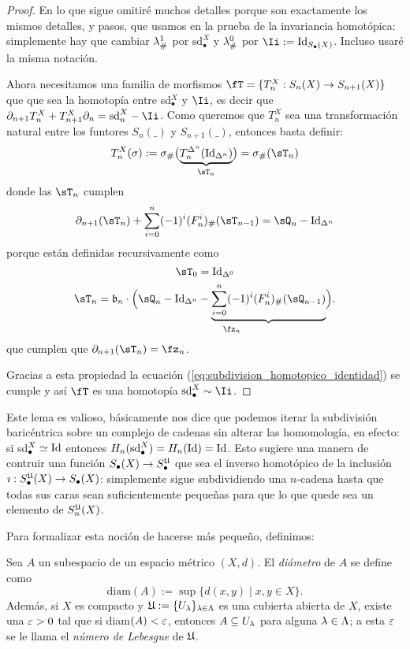 \documentclass[../../topologia_algebraica]{subfiles}
\begin{document}
\begin{proof}
  En lo que sigue omitir\'e muchos detalles porque son exactamente los mismos
  detalles, y pasos, que usamos en la prueba de la invariancia homot\'opica:
  simplemente hay que cambiar $\lambda^1_{\#}$ por $\text{sd}^X_{\bullet}$ y $\lambda^0_{\#}$
  por $\Ii:=\Id_{S_{\bullet}(X)}$. Incluso usar\'e la misma notaci\'on.
  
  Ahora necesitamos una familia de morfismos $\fT=\{T^X_n:S_n(X)\ra S_{n+1}(X)\}$ que
  que sea la homotop\'ia entre sd$^X_{\bullet}$ y $\Ii$, es decir
  que $\partial_{n+1}T^X_n+T^X_{n+1}\partial_n=\text{sd}^X_n-\Ii$. Como queremos que
  $T^X_n$ sea una transformaci\'on natural entre los funtores $S_n(\_)$ y $S_{n+1}(\_)$,
  entonces basta definir:
  \[
    T^X_n(\sigma):=
    \sigma_{\#}\big(\underset{\sT_n}{\underbrace{T^{\Delta^n}_n(\Id_{\Delta^n})}} \big)=
    \sigma_{\#}(\sT_n)
  \]
  donde las $\sT_n$ cumplen
  \begin{equation}\label{eq:subdivision_homotopico_identidad}
    \partial_{n+1}(\sT_n)+\sum_{i=0}^n(-1)^i(F^i_n)_{\#}(\sT_{n-1})=\sQ_n-\Id_{\Delta^n}
  \end{equation}
  porque est\'an definidas recursivamente como
  \[
    \sT_0=\Id_{\Delta^0}
  \]
  \[
    \sT_n=\fb_n\cdot\Big(\underset{\fz_n}{\sQ_n-\Id_{\Delta^n}-
      \underbrace{\sum_{i=0}^n(-1)^i(F^i_n)_{\#}(\sQ_{n-1})}} \Big).
  \]
  que cumplen que $\partial_{n+1}(\sT_n)=\fz_n$.

  Gracias a esta propiedad la ecuaci\'on (\ref{eq:subdivision_homotopico_identidad})
  se cumple y as\'i $\fT$ es una homotop\'ia $\text{sd}^X_{\bullet}\sim\Ii$.
\end{proof}

Este lema es valioso, b\'asicamente nos dice que podemos iterar la subdivisi\'on
baric\'entrica sobre un complejo de cadenas sin alterar las homomolog\'ia, en efecto:
si sd$^X_{\bullet}\simeq\text{Id}$ entonces $H_n(\text{sd}^X_{\bullet})=H_n(\text{Id})=\text{Id}$. Esto
sugiere una manera de contruir una funci\'on $S_{\bullet}(X)\rightarrow S_{\bullet}^{\mathfrak{U}}$
que sea el inverso homot\'opico de la inclusi\'on $\imath: S_{\bullet}^{\mathfrak{U}}(X)\rightarrow S_{\bullet}(X)$:
simplemente sigue subdividiendo una $n$-cadena hasta que todas sus caras sean
suficientemente peque\~nas para que lo que quede sea un elemento de $S_n^{\mathfrak{U}}(X)$.

Para formalizar esta noci\'on de hacerse m\'as peque\~no, definimos:

\begin{defin}
  Sea $A$ un subespacio de un espacio m\'etrico $(X,d)$. El \emph{di\'ametro} de $A$ se
  define como
  \[
    \text{diam}(A):=\sup\{d(x,y)\mid x,y\in X\}.
  \]
  Adem\'as, si $X$ es compacto y $\mathfrak{U}:=\{U_{\lambda}\}_{\lambda\in\Lambda}$ es una cubierta abierta
  de $X$, existe una $\varepsilon>0$ tal que si diam$(A)<\varepsilon$, entonces $A\subseteq U_{\lambda}$
  para alguna $\lambda\in\Lambda$; a esta $\varepsilon$ se le llama el \emph{n\'umero de Lebesgue}
  de $\mathfrak{U}$.
\end{defin}
\end{document}
